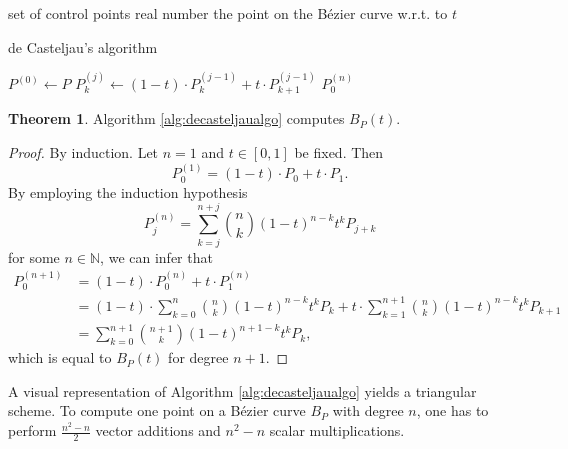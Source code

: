 \documentclass[a4paper, 11pt]{report}
\theoremstyle{definition}
\newtheorem{theorem}[definition]{Theorem}
\newcommand{\Desc}[2]{\State \makebox[12em][l]{#1}#2}
\begin{document}
	\begin{algorithm}[H]
		\begin{algorithmic}[1]
			\Input
				\Desc{$P = \{P_0, P_1, \ldots, P_n\}$}{set of control points}
				\Desc{$t$}{real number}
			\EndInput
			\Output
				\Desc{$P^{(n)}_0 = B_P(t)$}{the point on the Bézier curve w.r.t. to $t$}
			\EndOutput

			\caption{de Casteljau's algorithm}\label{alg:decasteljaualgo}
				\State $P^{(0)} \gets P$
						\State $P^{(j)}_k \gets (1-t) \cdot P^{(j-1)}_k + t \cdot P^{(j-1)}_{k+1}$
					\EndFor
				\EndFor
				\State \Return $P^{(n)}_0$
			\EndProcedure
		\end{algorithmic}
	\end{algorithm}

	\begin{theorem}
		Algorithm \ref{alg:decasteljaualgo} computes $B_P(t)$.
	\end{theorem}
	\begin{proof}
		By induction. Let $n = 1$ and $t \in [0,1]$ be fixed. Then
			$$ P_0^{(1)} = (1-t) \cdot P_0 + t \cdot P_1.$$
		By employing the induction hypothesis
			$$ P_j^{(n)} = \sum_{k=j}^{n+j} \binom{n}{k} (1-t)^{n-k}t^k P_{j+k}$$
		for some $n \in \mathbb{N}$, we can infer that
		\begin{align*}
			P_0^{(n+1)}	&= (1-t) \cdot P_0^{(n)} + t \cdot P_1^{(n)} \\
						&= (1-t) \cdot \sum_{k=0}^{n} \binom{n}{k} (1-t)^{n-k}t^k P_{k} + t \cdot \sum_{k=1}^{n+1} \binom{n}{k} (1-t)^{n-k}t^k P_{k+1} \\
						&= \sum_{k=0}^{n+1} \binom{n+1}{k} (1-t)^{n+1-k}t^k P_{k},
		\end{align*}
		which is equal to $B_P(t)$ for degree $n+1$.
	\end{proof}

	A visual representation of Algorithm \ref{alg:decasteljaualgo} yields a triangular scheme. To compute one point on a Bézier curve $B_P$ with degree $n$, one has to perform $\frac{n^2-n}{2}$ vector additions and $n^2-n$ scalar multiplications.
\end{document}
